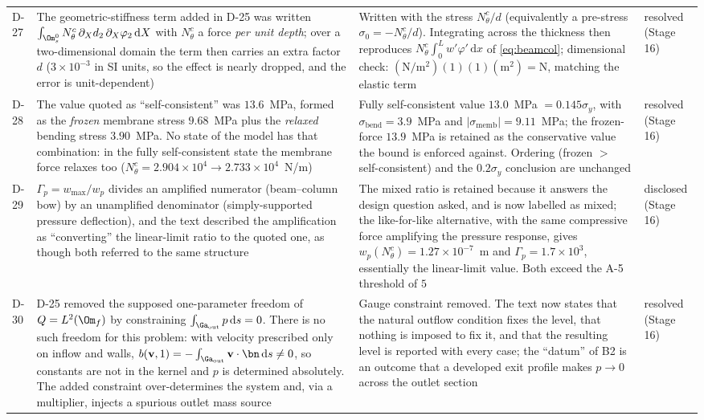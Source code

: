 \begin{longtable}{p{1cm}p{4.6cm}p{5.2cm}p{3.2cm}}
D-27 & The geometric-stiffness term added in D-25 was written $\int_{\Om_s^0}N_\theta^c\,\partial_Xd_2\,\partial_X\varphi_2\,\mathrm dX$ with $N_\theta^c$ a force \emph{per unit depth}; over a two-dimensional domain the term then carries an extra factor $d$ ($3\times10^{-3}$ in SI units, so the effect is nearly dropped, and the error is unit-dependent) & Written with the stress $N_\theta^c/d$ (equivalently a pre-stress $\sigma_0=-N_\theta^c/d$). Integrating across the thickness then reproduces $N_\theta^c\int_0^Lw'\varphi'\,\mathrm dx$ of \eqref{eq:beamcol}; dimensional check: $(\si{\newton\per\metre\squared})(1)(1)(\si{\metre\squared})=\si{\newton}$, matching the elastic term & resolved (Stage 16) \\
D-28 & The value quoted as ``self-consistent'' was $13.6$~MPa, formed as the \emph{frozen} membrane stress $9.68$~MPa plus the \emph{relaxed} bending stress $3.90$~MPa. No state of the model has that combination: in the fully self-consistent state the membrane force relaxes too ($N_\theta^c=2.904\times10^4\to2.733\times10^4$~N/m) & Fully self-consistent value $13.0$~MPa $=0.145\sigma_y$, with $\sigma_{\mathrm{bend}}=3.9$~MPa and $|\sigma_{\mathrm{memb}}|=9.11$~MPa; the frozen-force $13.9$~MPa is retained as the conservative value the bound is enforced against. Ordering (frozen $>$ self-consistent) and the $0.2\sigma_y$ conclusion are unchanged & resolved (Stage 16) \\
D-29 & $\Gamma_p=w_{\max}/w_p$ divides an amplified numerator (beam--column bow) by an unamplified denominator (simply-supported pressure deflection), and the text described the amplification as ``converting'' the linear-limit ratio to the quoted one, as though both referred to the same structure & The mixed ratio is retained because it answers the design question asked, and is now labelled as mixed; the like-for-like alternative, with the same compressive force amplifying the pressure response, gives $w_p(N_\theta^c)=1.27\times10^{-7}$~m and $\Gamma_p=1.7\times10^{3}$, essentially the linear-limit value. Both exceed the A-5 threshold of $5$ & disclosed (Stage 16) \\
D-30 & D-25 removed the supposed one-parameter freedom of $Q=L^2(\Om_f)$ by constraining $\int_{\Ga_{\mathrm{out}}}p\,\mathrm ds=0$. There is no such freedom for this problem: with velocity prescribed only on inflow and walls, $b(\mathbf v,1)=-\int_{\Ga_{\mathrm{out}}}\mathbf v\cdot\bn\,\mathrm ds\neq0$, so constants are not in the kernel and $p$ is determined absolutely. The added constraint over-determines the system and, via a multiplier, injects a spurious outlet mass source & Gauge constraint removed. The text now states that the natural outflow condition fixes the level, that nothing is imposed to fix it, and that the resulting level is reported with every case; the ``datum'' of B2 is an outcome that a developed exit profile makes $p\to0$ across the outlet section & resolved (Stage 16) \\

\end{longtable}
